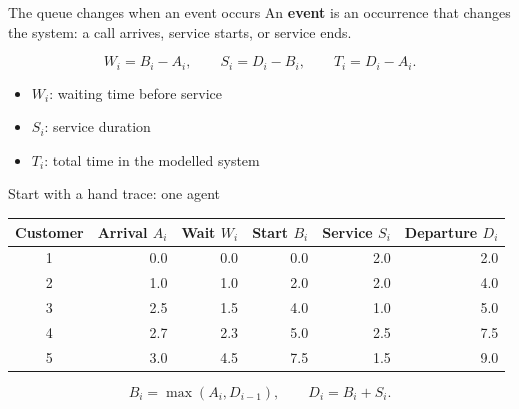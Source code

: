 \documentclass{beamer}
\begin{document}
\begin{frame}{The queue changes when an event occurs}
  \centering
  An \textbf{event} is an occurrence that changes the system: a call arrives,
  service starts, or service ends.
  \vspace{0.6em}

  \vspace{0.9em}
  \[
    W_i=B_i-A_i,\qquad S_i=D_i-B_i,\qquad T_i=D_i-A_i.
  \]
  \begin{itemize}
    \item $W_i$: waiting time before service
    \item $S_i$: service duration
    \item $T_i$: total time in the modelled system
  \end{itemize}
\end{frame}

\begin{frame}{Start with a hand trace: one agent}
  \centering
  \small
  \setlength{\tabcolsep}{5pt}
  \begin{tabular}{@{}crrrrr@{}}
    \toprule
    Customer & Arrival $A_i$ & Wait $W_i$ & Start $B_i$ & Service $S_i$ & Departure $D_i$\\
    \midrule
    1 & 0.0 & 0.0 & 0.0 & 2.0 & 2.0\\
    2 & 1.0 & 1.0 & 2.0 & 2.0 & 4.0\\
    3 & 2.5 & 1.5 & 4.0 & 1.0 & 5.0\\
    4 & 2.7 & 2.3 & 5.0 & 2.5 & 7.5\\
    5 & 3.0 & 4.5 & 7.5 & 1.5 & 9.0\\
    \bottomrule
  \end{tabular}
  \normalsize
  \vspace{0.8em}
  \[
    B_i=\max(A_i,D_{i-1}),\qquad D_i=B_i+S_i.
  \]
\end{frame}
\end{document}
